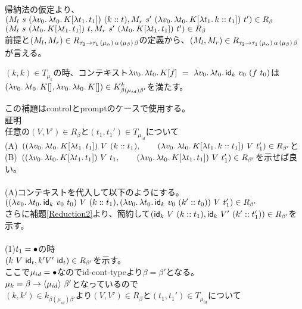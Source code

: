  帰納法の仮定より、\\
 $(M_l\ s \ \LamP{v_0}{\Lam{t_0}{K[\Lam{t_1}{t_1}]}}\ \ConsP{k}{t}, M_r\ s' \ \LamP{v_0}{\Lam{t_0}{K[\Lam{t_1}{\Cons{k}{t_1}}]}}\ t')\in R_{\beta}$\\
 $(M_l\ s \ \LamP{t_0}{K[\Lam{t_1}{t_1}]}\ t, M_r\ s' \ \LamP{t_0}{K[\Lam{t_1}{t_1}]}\ t')\in R_{\beta}$\\
 前提と$(M_l, M_r) \in R_{\TypeArrow{\tau_2}{\tau_1}{\mu_{\alpha}}{\alpha}{\mu_{\beta}}{\beta}}$の定義から、$(M_l, M_r) \in R_{\TypeArrow{\tau_2}{\tau_1}{\mu_{\alpha}}{\alpha}{\mu_{\beta}}{\beta}}$が言える。
\\
\begin{lemma}
  $(k,k)\in T_{\mu_k}$の時、コンテキスト$\Lam{v_0}{\Lam{t_0}{K[f]}}\ =\ \Lam{v_0}{\Lam{t_0}{\Idk\ v_0\ (f\ t_0)}}$は$(\Lam{v_0}{\Lam{t_0}{K[]}}, \Lam{v_0}{\Lam{t_0}{K[]}})\in  K^k_{\beta(\mu_{id})\beta'}$を満たす。
\label{IdkContext}
\end{lemma}
この補題はcontrolとpromptのケースで使用する。
\\
\lbrack 証明 \rbrack\\
任意の$(V,V')\in R_{\beta}$と$(t_1,t_1')\in T_{\mu_{id}}$について\\
(A)\ $(\LamP{v_0}{\Lam{t_0}{K[\Lam{t_1}{t_1}]}}\ V\ (\Cons{k}{t_1}),
\qquad \LamP{v_0}{\Lam{t_0}{K[\Lam{t_1}{\Cons{k}{t_1}}]}}\ V\ t_1')\in R_{\beta'}$と\\
(B)\ $(\LamP{v_0}{\Lam{t_0}{K[\Lam{t_1}{t_1}]}}\ V\ t_1,
\qquad \LamP{v_0}{\Lam{t_0}{K[\Lam{t_1}{t_1}]}}\ V\ t_1')\in R_{\beta'}$を示せば良い。\\
\\
(A)コンテキストを代入して以下のようにする。\\
$(\LamP{v_0}{\Lam{t_0}{\Idk\ v_0\ t_0}}\ V\ (\Cons{k}{t_1}),
\LamP{v_0}{\Lam{t_0}{\Idk\ v_0\ (\Cons{k'}{t_0})}}\ V\ t_1')\in R_{\beta'}$\\
さらに補題\ref{Reduction2}より、簡約して$(\Idk\ V\ (\Cons{k}{t_1}),\Idk\ V'\ (\Cons{k'}{t_1'}))\in R_{\beta'}$を示す。\\
\\
(1)$t_1=\Bullet$の時\\
$(k\ V\ \Idt,k' V'\ \Idt)\in R_{\beta'}$を示す。\\
ここで$\mu_{id}=\Bullet$なので\textsf{id-cont-type}より$\beta=\beta'$となる。\\
$\mu_k = \Trail{\beta}{\beta'}{\mu_{id}}$となっているので\\
$(k,k')\in k_{\beta(\mu_{id})\beta'}$より$(V,V')\in R_{\beta}$と$(t_1,t_1')\in T_{\mu_{id}}$について\\
